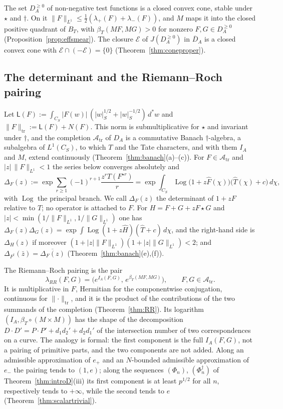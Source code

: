 \documentclass[11pt]{amsart}
\theoremstyle{definition}
\theoremstyle{remark}
\newcommand{\dstar}{\,d^{*}}
\begin{document}
The set $D_A^{\ge0}$ of non-negative test functions is a closed convex cone,
stable under $\star$ and $\dagger$.  On it
$\lVert F\rVert_{L^{1}}\le\tfrac12(\lambda_+(F)+\lambda_-(F))$, and $M$ maps
it into the closed positive quadrant of $B_T$, with
$\beta_T(MF,MG)>0$ for nonzero $F,G\in D_A^{\ge0}$
(Proposition~\ref{prop:effsmear}).  The closure $\mathcal E$ of
$J(D_A^{\ge0})$ in $\overline{D}_A$ is a closed convex cone with
$\mathcal E\cap(-\mathcal E)=\{0\}$ (Theorem~\ref{thm:coneproper}).

\subsection*{The determinant and the Riemann--Roch pairing}

Let $\mathsf L(F):=\int_{C_S}|F(w)|\,(|w|_S^{1/2}+|w|_S^{-1/2})\dstar w$ and
$\lVert F\rVert_{\mathrm{tr}}:=\mathsf L(F)+N(F)$.  This norm is
submultiplicative for $\star$ and invariant under $\dagger$, and the
completion $\mathcal A_{\mathrm{tr}}$ of $D_A$ is a commutative Banach
$\dagger$-algebra, a subalgebra of $L^{1}(C_S)$, to which $T$ and the Tate
characters, and with them $I_A$ and $M$, extend continuously
(Theorem~\ref{thm:banach}(a)--(c)).  For $F\in\mathcal A_{\mathrm{tr}}$ and
$|z|\,\lVert F\rVert_{L^{1}}<1$ the series below converges absolutely and
\[
\Delta_F(z):=\exp\sum_{r\ge1}(-1)^{r+1}\frac{z^{r}T(F^{\star r})}{r}
=\exp\int_{\widehat C_S}\operatorname{Log}\bigl(1+z\widehat F(\chi)\bigr)
\bigl(\widehat T(\chi)+c\bigr)\,d\chi ,
\]
with $\operatorname{Log}$ the principal branch.  We call $\Delta_F(z)$ the
determinant of $1+zF$ relative to $T$; no operator is attached to $F$.  For
$H=F+G+zF\star G$ and
$|z|<\min(1/\lVert F\rVert_{L^{1}},1/\lVert G\rVert_{L^{1}})$ one has
$\Delta_F(z)\Delta_G(z)=\exp\int\operatorname{Log}(1+z\widehat H)
(\widehat T+c)\,d\chi$, and the right-hand side is $\Delta_H(z)$ if moreover
$(1+|z|\lVert F\rVert_{L^{1}})(1+|z|\lVert G\rVert_{L^{1}})<2$; and
$\Delta_{F^{\dagger}}(\bar z)=\overline{\Delta_F(z)}$
(Theorem~\ref{thm:banach}(e),(f)).

The Riemann--Roch pairing is the pair
\[
\lambda_{RR}(F,G)=\bigl(e^{I_A(F,G)},\,e^{\beta_T(MF,MG)}\bigr),
\qquad F,G\in\mathcal A_{\mathrm{tr}} .
\]
It is multiplicative in $F$, Hermitian for the componentwise conjugation,
continuous for $\lVert\cdot\rVert_{\mathrm{tr}}$, and it is the product of the
contributions of the two summands of the completion
(Theorem~\ref{thm:RR}).  Its logarithm $(I_A,\beta_T\circ(M\times M))$ has the
shape of the decomposition $D\cdot D'=P\cdot P'+d_1d_2'+d_2d_1'$ of the
intersection number of two correspondences on a curve.  The analogy is formal:
the first component is the full $I_A(F,G)$, not a pairing of primitive parts,
and the two components are not added.  Along an admissible approximation of
$e_+$ and an $N$-bounded admissible approximation of $e_-$ the pairing tends
to $(1,e)$; along the sequences $(\Phi_n)$, $(\Phi_n^{\dagger})$ of
Theorem~\ref{thm:introD}(iii) its first component is at least $p^{1/2}$ for
all $n$, respectively tends to $+\infty$, while the second tends to $e$
(Theorem~\ref{thm:scalartrivial}).
\end{document}
